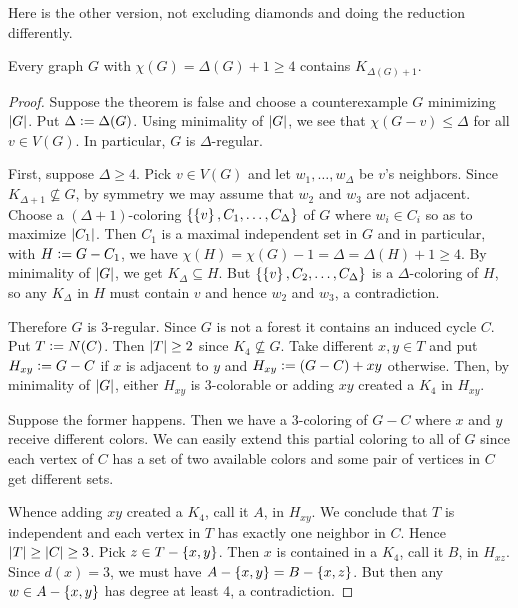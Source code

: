 Here is the other version, not excluding diamonds and doing the reduction differently.

\begin{thm}
Every graph $G$ with $\chi(G) = \Delta(G) + 1 \geq 4$ contains
$K_{\Delta(G) + 1}$.
\end{thm}
\begin{proof}
Suppose the theorem is false and choose a counterexample $G$ minimizing
$\left|G\right|$.  Put $\Delta \mathrel{\mathop:}= \Delta(G)$. Using minimality of $\left|G\right|$,
we see that $\chi(G - v) \leq \Delta$ for all $v \in
V(G)$. In particular, $G$ is $\Delta$-regular.

First, suppose $\Delta \geq 4$.  Pick $v \in V(G)$ and let $w_1, \ldots,
w_\Delta$ be $v$'s neighbors. Since $K_{\Delta + 1} \not \subseteq G$, by
symmetry we may assume that $w_2$ and $w_3$ are not adjacent. Choose a $(\Delta
+ 1)$-coloring $\left\{ \left\{ v \right\}, C_1, \ldots, C_\Delta \right\}$ of $G$ where $w_i \in
C_i$ so as to maximize $\left|C_1\right|$.  Then $C_1$ is a maximal independent set in
$G$ and in particular, with $H \mathrel{\mathop:}= G - C_1$, we have $\chi(H) =
\chi(G) - 1 = \Delta = \Delta(H) + 1 \geq 4$.  By minimality of $\left|G\right|$, we
get $K_\Delta \subseteq H$.  But $\left\{ \left\{ v \right\}, C_2, \ldots, C_\Delta \right\}$ is a
$\Delta$-coloring of $H$, so any $K_\Delta$ in $H$ must contain $v$ and hence
$w_2$ and $w_3$, a contradiction.

Therefore $G$ is $3$-regular.  Since $G$ is not a forest it contains an induced
cycle $C$.  Put $T \mathrel{\mathop:}= N(C)$.  Then $\left|T\right| \geq 2$ since $K_4 \not
\subseteq G$.  Take different $x, y \in T$ and put $H_{xy} \mathrel{\mathop:}= G - C$ if
$x$ is adjacent to $y$ and $H_{xy} \mathrel{\mathop:}= (G-C) + xy$ otherwise.  Then, by
minimality of $\left|G\right|$, either $H_{xy}$ is $3$-colorable or adding $xy$
created a $K_4$ in $H_{xy}$.

Suppose the former happens.  Then we have a $3$-coloring of $G - C$
where $x$ and $y$ receive different colors.  We can easily extend this partial
coloring to all of $G$ since each vertex of $C$ has a set of two available
colors and some pair of vertices in $C$ get different sets. 

Whence adding $xy$ created a $K_4$, call it $A$, in $H_{xy}$.  We conclude that
$T$ is independent and each vertex in $T$ has exactly one neighbor in $C$.  Hence
$\left|T\right| \geq \left|C\right| \geq 3$. Pick $z \in T - \left\{ x,y \right\}$.  Then $x$ is
contained in a $K_4$, call it $B$, in $H_{xz}$.  Since $d(x) = 3$, we must have
$A - \left\{ x,y \right\} = B - \left\{ x, z \right\}$.  But then any $w \in A - \left\{ x,y \right\}$ has degree
at least $4$, a contradiction.
\end{proof}
